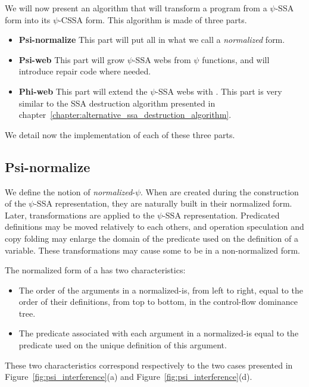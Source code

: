 We will now present an algorithm that will transform a program from a
$\psi$-SSA form into its $\psi$-CSSA form. This algorithm is made of
three parts.

\begin{itemize}
\item {\bf Psi-normalize} This part will put all \psifuns
in what we call a {\em normalized} form.
\item {\bf Psi-web} This part will grow $\psi$-SSA webs from $\psi$
  functions, and will introduce repair code where needed.
\item {\bf Phi-web} This part will extend the $\psi$-SSA webs with
  \phifuns. This part is very similar to the SSA destruction
  algorithm presented in chapter~\ref{chapter:alternative_ssa_destruction_algorithm}.
\end{itemize}

We detail now the implementation of each of these three parts.

\subsection{Psi-normalize}

We define the notion of {\em normalized}-$\psi$. When \psifuns
are created during the construction of the $\psi$-SSA representation,
they are naturally built in their normalized form. Later,
transformations are applied to the $\psi$-SSA representation.
Predicated definitions may be moved relatively to each others, and
operation speculation and copy folding may enlarge the domain of the
predicate used on the definition of a variable. These transformations
may cause some \psifuns to be in a non-normalized form.

The normalized form of a \psifun has two characteristics:

\begin{itemize}
\item The order of the arguments in a normalized-\psifun is,
from left to right, equal to the order of their definitions, from top
to bottom, in the control-flow dominance tree.
\item The predicate associated with each argument in a
normalized-\psifun is equal to the predicate used on the
unique definition of this argument.
\end{itemize}

These two characteristics correspond respectively to the two cases
presented in Figure~\ref{fig:psi_interference}(a) and
Figure~\ref{fig:psi_interference}(d).

